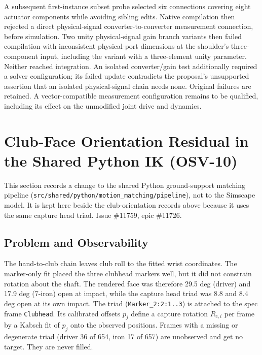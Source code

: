 \documentclass[11pt,a4paper]{article}
\begin{document}
A subsequent first-instance subset probe selected six connections
covering eight actuator components while avoiding sibling edits. Native
compilation then rejected a direct physical-signal converter-to-converter
measurement connection, before simulation. Two unity physical-signal gain
branch variants then failed compilation with inconsistent physical-port
dimensions at the shoulder's three-component input, including the variant
with a three-element unity parameter. Neither reached integration. An
isolated converter/gain test additionally required a solver configuration;
its failed update contradicts the proposal's unsupported assertion that
an isolated physical-signal chain needs none. Original failures are
retained. A vector-compatible measurement configuration remains to be
qualified, including its effect on the unmodified joint drive and dynamics.

\section{Club-Face Orientation Residual in the Shared Python IK (OSV-10)}
This section records a change to the shared Python ground-support matching
pipeline (\texttt{src/shared/python/motion\_matching/pipeline}), not to the
Simscape model. It is kept here beside the club-orientation records above
because it uses the same capture head triad. Issue \#11759, epic \#11726.

\subsection{Problem and Observability}
The hand-to-club chain leaves club roll to the fitted wrist coordinates. The
marker-only fit placed the three clubhead markers well, but it did not
constrain rotation about the shaft. The rendered face was therefore 29.5 deg
(driver) and 17.9 deg (7-iron) open at impact, while the capture head triad
was 8.8 and 8.4 deg open at its own impact. The triad
(\texttt{Marker\_2:2:1..3}) is attached to the spec frame \texttt{Clubhead}.
Its calibrated offsets $p_j$ define a capture rotation $R_{c,i}$ per frame by
a Kabsch fit of $p_j$ onto the observed positions. Frames with a missing or
degenerate triad (driver 36 of 654, iron 17 of 657) are unobserved and get no
target. They are never filled.
\end{document}
